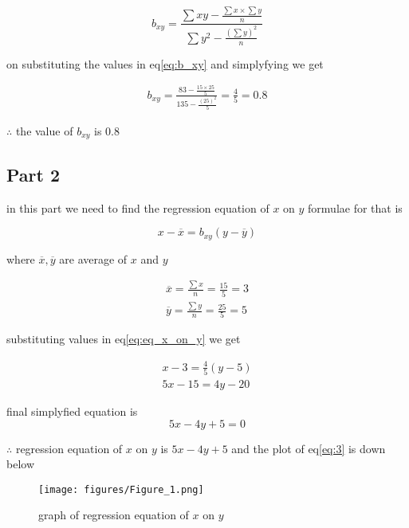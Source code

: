 \documentclass[journal,12pt,twocolumn]{IEEEtran}
\begin{document}
\begin{flushleft}
      \begin{equation}
          \label{eq:b_xy}
          b_{xy}=\frac{\sum xy-\frac{{\sum x}\times  {\sum y}}{n} }{\sum y^{2}-\frac{(\sum y)^{2}}{n} }
      \end{equation}
      
   on substituting the values in eq\eqref{eq:b_xy} and simplyfying  we get 
 
      \begin{align}
          b_{xy}=\frac{83-\frac{15\times25}{5}}{135-\frac{(25)^{2}}{5} } = \frac{4}{5} = 0.8
      \end{align}
     
$\therefore$ the value of $b_{xy}$ is 0.8
 
 
 
 
\subsection*{\textbf{Part 2}}
 in this part we need to find the regression equation of $x$ on $y$
 \newline
 formulae for that is 
 
       \begin{equation}
           \label{eq:eq_x_on_y}
           x-\overline{x} = b_{xy}(y-\overline{y})
       \end{equation}
       
  where $\overline{x},\overline{y}$ are average of $x$ and $y$
 
       \begin{align}
           \overline{x} = \frac{\sum x}{n} = \frac{15}{5} = 3 \\
           \overline{y} = \frac{\sum y}{n} = \frac{25}{5} = 5
       \end{align}
    
  substituting values in eq\eqref{eq:eq_x_on_y} we get 
 
      \begin{align}
          x-3 = \frac{4}{5}(y-5) \\
          5x - 15 = 4y - 20 
      \end{align}
      
   final simplyfied equation is 
      \begin{equation}
          \label{eq:3}
          5x - 4y + 5 = 0
    \end{equation}
    
    
    
$\therefore$ regression equation of $x$ on $y$ is $5x-4y+5$ and the plot of eq\eqref{eq:3} is down below



\begin{figure}[h!]
		\centering
     	\texttt{[image: figures/Figure\_1.png]}
    	\caption{graph of regression equation of $x$ on $y$}
	    \label{Fig1}
\end{figure}

\end{flushleft}
\end{document}
